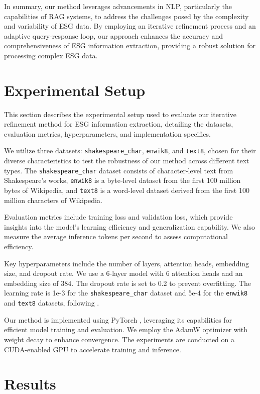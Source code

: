\documentclass{article} %
\begin{document}
In summary, our method leverages advancements in NLP, particularly the capabilities of RAG systems, to address the challenges posed by the complexity and variability of ESG data. By employing an iterative refinement process and an adaptive query-response loop, our approach enhances the accuracy and comprehensiveness of ESG information extraction, providing a robust solution for processing complex ESG data.

\section{Experimental Setup}
\label{sec:experimental}

This section describes the experimental setup used to evaluate our iterative refinement method for ESG information extraction, detailing the datasets, evaluation metrics, hyperparameters, and implementation specifics.

We utilize three datasets: \texttt{shakespeare\_char}, \texttt{enwik8}, and \texttt{text8}, chosen for their diverse characteristics to test the robustness of our method across different text types. The \texttt{shakespeare\_char} dataset consists of character-level text from Shakespeare's works, \texttt{enwik8} is a byte-level dataset from the first 100 million bytes of Wikipedia, and \texttt{text8} is a word-level dataset derived from the first 100 million characters of Wikipedia.

Evaluation metrics include training loss and validation loss, which provide insights into the model's learning efficiency and generalization capability. We also measure the average inference tokens per second to assess computational efficiency.

Key hyperparameters include the number of layers, attention heads, embedding size, and dropout rate. We use a 6-layer model with 6 attention heads and an embedding size of 384. The dropout rate is set to 0.2 to prevent overfitting. The learning rate is 1e-3 for the \texttt{shakespeare\_char} dataset and 5e-4 for the \texttt{enwik8} and \texttt{text8} datasets, following \citet{kingma2014adam}.

Our method is implemented using PyTorch \citep{paszke2019pytorch}, leveraging its capabilities for efficient model training and evaluation. We employ the AdamW optimizer \citep{loshchilov2017adamw} with weight decay to enhance convergence. The experiments are conducted on a CUDA-enabled GPU to accelerate training and inference.

\section{Results}
\label{sec:results}
\end{document}
